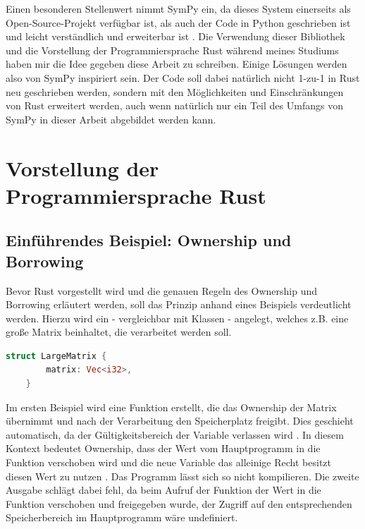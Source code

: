 \documentclass[11pt,a4paper, ngerman]{article}
\begin{document}
Einen besonderen Stellenwert nimmt SymPy ein, da dieses System einerseits als Open-Source-Projekt verfügbar ist, als auch der Code in Python geschrieben ist und leicht verständlich und erweiterbar ist \cite[S. 1]{SympyPeerJ}. Die Verwendung dieser Bibliothek und die Vorstellung der Programmiersprache Rust während meines Studiums haben mir die Idee gegeben diese Arbeit zu schreiben. Einige Lösungen werden also von SymPy inspiriert sein. Der Code soll dabei natürlich nicht 1-zu-1 in Rust neu geschrieben werden, sondern mit den Möglichkeiten und Einschränkungen von Rust erweitert werden, auch wenn natürlich nur ein Teil des Umfangs von SymPy in dieser Arbeit abgebildet werden kann.

\newpage

\section{Vorstellung der Programmiersprache Rust}
\subsection{Einführendes Beispiel: Ownership und Borrowing}
Bevor Rust vorgestellt wird und die genauen Regeln des Ownership und Borrowing erläutert werden, soll das Prinzip anhand eines Beispiels verdeutlicht werden. Hierzu wird ein  - vergleichbar mit Klassen - angelegt, welches z.B. eine große Matrix beinhaltet, die verarbeitet werden soll.

\begin{lstlisting}[language=rust, caption={Einführendes Beispiel: struct}]
    struct LargeMatrix {
        matrix: Vec<i32>,
    }
\end{lstlisting}

 Im ersten Beispiel wird eine Funktion erstellt, die das Ownership der Matrix übernimmt und nach der Verarbeitung den Speicherplatz freigibt. Dies geschieht automatisch, da der Gültigkeitsbereich der Variable  verlassen wird \cite{RustOwnershipFreed}. In diesem Kontext bedeutet Ownership, dass der Wert vom Hauptprogramm in die Funktion verschoben wird und die neue Variable  das alleinige Recht besitzt diesen Wert zu nutzen \cite{RustMovingTerm}. Das Programm lässt sich so nicht kompilieren. Die zweite Ausgabe schlägt dabei fehl, da beim Aufruf der Funktion der Wert in die Funktion verschoben und freigegeben wurde, der Zugriff auf den entsprechenden Speicherbereich im Hauptprogramm wäre undefiniert.
\end{document}
